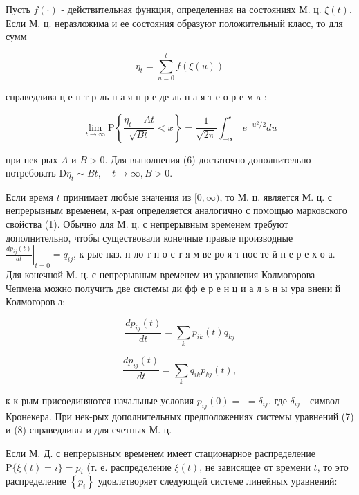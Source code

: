 \documentclass[10pt]{article}
\begin{document}
Пусть $f(\cdot)$ - действительная функция, определенная на состояниях М. ц. $\xi(t)$. Если М. ц. неразложима и ее состояния образуют положительный класс, то для сумм



\[

\eta_{t}=\sum_{u=0}^{t} f(\xi(u))

\]



справедлива ц е н т р ль н а я п р е де ль н а я т е о р е м a :



\[

\lim _{t \rightarrow \infty} \mathrm{P}\left\{\frac{\eta_{t}-A t}{\sqrt{B t}}<x\right\}=\frac{1}{\sqrt{2 \pi}} \int_{-\infty}^{\mathcal{c}} e^{-u^{2} / 2} d u

\]



при нек-рых $A$ и $B>0$. Для выполнения (6) достаточно дополнительно потребовать $\mathrm{D} \eta_{t} \sim B t, \quad t \rightarrow \infty, B>0$.



Если время $t$ принимает любые значения из $[0, \infty)$, то М. ц. является М. ц. с непрерывным временем, к-рая определяется аналогично с помощью марковского свойства (1). Обычно для М. ц. с непрерывным временем требуют дополнительно, чтобы существовали конечные правые производные $\left.\frac{d p_{i j}(t)}{d t}\right|_{t=0}=q_{i j}$, к-рые наз. п ло т н о с т я м ве ро я т нос те й п е р е х о а. Для конечной М. ц. с непрерывным временем из уравнения Колмогорова - Чепмена можно получить две системы ди фф е р е н ц и а л ь н ы ура внени й Колмогоров а:



\[

\frac{d p_{i j}(t)}{d t}=\sum_{k} p_{i k}(t) q_{k j}

\]



\[

\frac{d p_{i j}(t)}{d t}=\sum_{k} q_{i k} p_{k j}(t),

\]



к к-рым присоединяются начальные условия $p_{i j}(0)=$ $=\delta_{i j}$, где $\delta_{i j}$ - символ Кронекера. При нек-рых дополнительных предположениях системы уравнений (7) и (8) справедливы и для счетных М. ц.



Если М. Д. с непрерывным временем имеет стационарное распределение $\mathrm{P}\{\xi(t)=i\}=p_{i}$ (т. е. распределение $\xi(t)$, не зависящее от времени $t$, то это распределение $\left\{p_{i}\right\}$ удовлетворяет следующей системе линейных уравнений:
\end{document}
